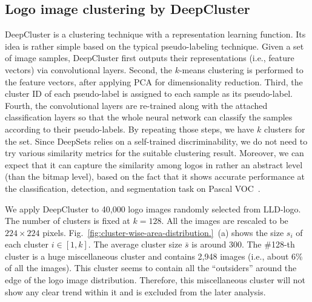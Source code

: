 \documentclass[runningheads]{llncs}
\begin{document}
\subsection{Logo image clustering by DeepCluster~\cite{Caron2018deepcluster}}
DeepCluster is a clustering technique with a representation learning function. Its idea is rather simple based on the typical pseudo-labeling technique. Given a set of image samples, DeepCluster first outputs their representations (i.e., feature vectors) via convolutional layers. Second, the $k$-means clustering is performed to the feature vectors, after applying PCA for dimensionality reduction. Third, the cluster ID of each pseudo-label is assigned to each sample as its pseudo-label. Fourth, the convolutional layers are re-trained along with the attached classification layers so that the whole neural network can classify the samples according to their pseudo-labels. By repeating those steps, we have $k$ clusters for the set. Since DeepSets relies on a self-trained discriminability, we do not need to try various similarity metrics for the suitable clustering result. Moreover, we can expect that it can capture the similarity among logos in rather an abstract level (than the bitmap level), based on the fact that it shows accurate performance at the classification, detection, and segmentation task on Pascal VOC~\cite{Caron2018deepcluster}.\par
%
We apply DeepCluster to 40,000 logo images randomly selected from LLD-logo. 
The number of clusters is fixed at $k=128$. All the images are rescaled to be 
$224\times 224$ pixels. Fig.~\ref{fig:cluster-wise-area-distribution.}~(a) shows the size $s_i$ of each cluster $i\in [1,k]$. The average cluster size $\bar{s}$ is around 300. The \#128-th cluster is a huge miscellaneous cluster and contains 2,948 images (i.e., about 6\% of all the images). This cluster seems to contain all the ``outsiders'' around the edge of the logo image distribution. Therefore, this miscellaneous cluster will not show any clear trend within it and is excluded from the later analysis.\par
\end{document}
